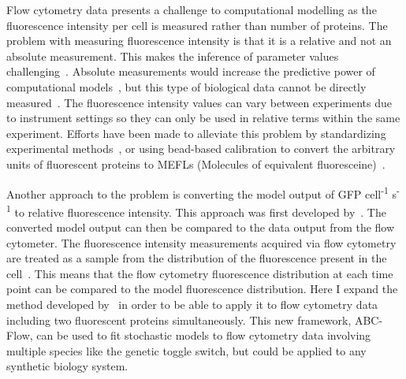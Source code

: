 Flow cytometry data presents a challenge to computational modelling as the fluorescence intensity per cell is measured rather than number of proteins. The problem with measuring fluorescence intensity is that it is a relative and not an absolute measurement. This makes the inference of parameter values challenging~\autocite{Rosenfeld:uh}. Absolute measurements would increase the predictive power of computational models~\autocite{Bower:2010jl, Cooling:2010bx}, but this type of biological data cannot be directly measured~\autocite{Kelwick:2014iy}. The fluorescence intensity values can vary between experiments due to instrument settings so they can only be used in relative terms within the same experiment. Efforts have been made to alleviate this problem by standardizing experimental methods~\autocite{Kelly:2009bj}, or using bead-based calibration to convert the arbitrary units of fluorescent proteins to MEFLs (Molecules of equivalent fluoresceine)~\autocite{Beal:2016cd}. 




Another approach to the problem is converting the model output of GFP cell\textsuperscript{-1} s\textsuperscript{-1} to relative fluorescence intensity. This approach was first developed by~\textcite{Lillacci:2013hu}. The converted model output can then be compared to the data output from the flow cytometer. The fluorescence intensity measurements acquired via flow cytometry are treated as a sample from the distribution of the fluorescence present in the cell~\autocite{Lillacci:2013hu}. This means that the flow cytometry fluorescence distribution at each time point can be compared to the model fluorescence distribution. Here I expand the method developed by~\textcite{Lillacci:2013hu} in order to be able to apply it to flow cytometry data including two fluorescent proteins simultaneously. This new framework, ABC-Flow, can be used to fit stochastic models to flow cytometry data involving multiple species like the genetic toggle switch, but could be applied to any synthetic biology system. 


